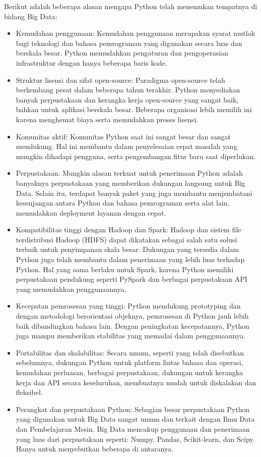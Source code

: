 \documentclass{article}
\begin{document}
Berikut adalah beberapa alasan mengapa Python telah menemukan tempatnya di bidang Big Data:
\begin{itemize}
    \item Kemudahan penggunaan: Kemudahan penggunaan merupakan syarat mutlak bagi teknologi dan bahasa pemrograman yang digunakan secara luas dan berskala besar. Python memudahkan pengaturan dan pengoperasian infrastruktur dengan hanya beberapa baris kode.
    \item Struktur lisensi dan sifat open-source: Paradigma open-source telah berkembang pesat dalam beberapa tahun terakhir. Python menyediakan banyak perpustakaan dan kerangka kerja open-source yang sangat baik, bahkan untuk aplikasi berskala besar. Beberapa organisasi lebih memilih ini karena menghemat biaya serta memudahkan proses lisensi.
    \item Komunitas aktif: Komunitas Python saat ini sangat besar dan sangat mendukung. Hal ini membantu dalam penyelesaian cepat masalah yang mungkin dihadapi pengguna, serta pengembangan fitur baru saat diperlukan.
    \item Perpustakaan: Mungkin alasan terkuat untuk penerimaan Python adalah banyaknya perpustakaan yang memberikan dukungan langsung untuk Big Data. Selain itu, terdapat banyak paket yang juga membantu menjembatani kesenjangan antara Python dan bahasa pemrograman serta alat lain, memudahkan deployment layanan dengan cepat.
    \item Kompatibilitas tinggi dengan Hadoop dan Spark: Hadoop dan sistem file terdistribusi Hadoop (HDFS) dapat dikatakan sebagai salah satu solusi terbaik untuk penyimpanan skala besar. Dukungan yang tersedia dalam Python juga telah membantu dalam penerimaan yang lebih luas terhadap Python. Hal yang sama berlaku untuk Spark, karena Python memiliki perpustakaan pendukung seperti PySpark dan berbagai perpustakaan API yang memudahkan penggunaannya.
    \item Kecepatan pemrosesan yang tinggi: Python mendukung prototyping dan dengan metodologi berorientasi objeknya, pemrosesan di Python jauh lebih baik dibandingkan bahasa lain. Dengan peningkatan kecepatannya, Python juga mampu memberikan stabilitas yang memadai dalam penggunaannya.
    \item Portabilitas dan skalabilitas: Secara umum, seperti yang telah disebutkan sebelumnya, dukungan Python untuk platform lintas bahasa dan operasi, kemudahan perluasan, berbagai perpustakaan, dukungan untuk kerangka kerja dan API secara keseluruhan, membuatnya mudah untuk diskalakan dan fleksibel.
    \item Perangkat dan perpustakaan Python: Sebagian besar perpustakaan Python yang digunakan untuk Big Data sangat umum dan terkait dengan Ilmu Data dan Pembelajaran Mesin. Big Data mencakup penggunaan dan penerimaan yang luas dari perpustakaan seperti: Numpy, Pandas, Scikit-learn, dan Scipy. Hanya untuk menyebutkan beberapa di antaranya.
\end{itemize}
\end{document}
